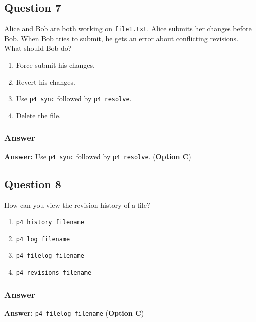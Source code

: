 \documentclass{article}
\begin{document}
\subsection*{Question 7}

Alice and Bob are both working on \texttt{file1.txt}. Alice submits her changes before Bob. When Bob tries to submit, he gets an error about conflicting revisions. What should Bob do?

\begin{enumerate}
    \item Force submit his changes.
    \item Revert his changes.
    \item Use \texttt{p4 sync} followed by \texttt{p4 resolve}.
    \item Delete the file.
\end{enumerate}

\subsubsection*{Answer}

\textbf{Answer:} Use \texttt{p4 sync} followed by \texttt{p4 resolve}. (\textbf{Option C})

\hrulefill

\subsection*{Question 8}

How can you view the revision history of a file?

\begin{enumerate}
    \item \texttt{p4 history filename}
    \item \texttt{p4 log filename}
    \item \texttt{p4 filelog filename}
    \item \texttt{p4 revisions filename}
\end{enumerate}

\subsubsection*{Answer}

\textbf{Answer:} \texttt{p4 filelog filename} (\textbf{Option C})

\hrulefill
\end{document}
